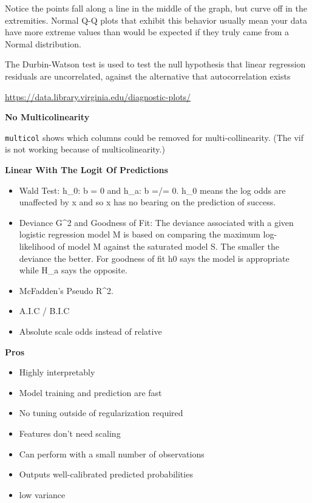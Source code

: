 \documentclass[]{book}
\begin{document}
Notice the points fall along a line in the middle of the graph, but curve off in the extremities. Normal Q-Q plots that exhibit this behavior usually mean your data have more extreme values than would be expected if they truly came from a Normal distribution.

The Durbin-Watson test is used to test the null hypothesis that linear regression residuals are uncorrelated, against the alternative that autocorrelation exists

\url{https://data.library.virginia.edu/diagnostic-plots/}

\textbf{No Multicolinearity}

\texttt{multicol} shows which columns could be removed for multi-collinearity. (The vif is not working because of multicolinearity.)

\textbf{Linear With The Logit Of Predictions}

\begin{itemize}
\item
  Wald Test: h\_0: b = 0 and h\_a: b =/= 0. h\_0 means the log odds are unaffected by x and so x has no bearing on the prediction of success.
\item
  Deviance G\^{}2 and Goodness of Fit: The deviance associated with a given logistic regression model M is based on comparing the maximum log-likelihood of model M against the saturated model S. The smaller the deviance the better. For goodness of fit h0 says the model is appropriate while H\_a says the opposite.
\item
  McFadden's Pseudo R\^{}2.
\item
  A.I.C / B.I.C
\item
  Absolute scale odds instead of relative
\end{itemize}

\textbf{Pros}

\begin{itemize}
\item
  Highly interpretably
\item
  Model training and prediction are fast
\item
  No tuning outside of regularization required
\item
  Features don't need scaling
\item
  Can perform with a small number of observations
\item
  Outputs well-calibrated predicted probabilities
\item
  low variance
\end{itemize}
\end{document}
